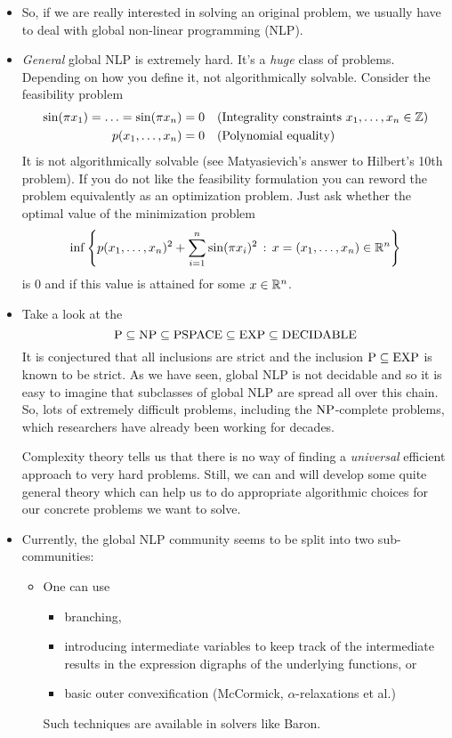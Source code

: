 \begin{itemize}
	\item So, if we are really interested in solving an original problem, we usually have to deal with global non-linear programming (NLP).
	\item \emph{General} global NLP is extremely hard. It's a \emph{huge} class of problems. Depending on how you define it, not algorithmically solvable. Consider the feasibility problem 
	\begin{align*}
		\sin(\pi x_1) = \ldots = \sin(\pi x_n) & = 0 & & \text{(Integrality constraints $x_1,\ldots,x_n \in \mathbb{Z}$)}
		\\ p(x_1,\ldots,x_n) & = 0 & & \text{(Polynomial equality)}
	\end{align*}
	It is not algorithmically solvable (see Matyasievich's answer to Hilbert's 10th problem). If you do not like the feasibility formulation you can reword the problem equivalently as an optimization problem. Just ask whether the optimal value of the minimization problem
	\[
		\inf \left\{ p(x_1,\ldots,x_n)^2 + \sum_{i=1}^n \sin(\pi x_i)^2 \,:\, x=(x_1,\ldots,x_n) \in \mathbb{R}^n \right\} 
	\]
	is $0$ and if this value is attained for some $x \in \mathbb{R}^n$.
	
	\item Take a look at the 
	\[
		\operatorname{P} \subseteq \operatorname{NP} \subseteq \operatorname{PSPACE} \subseteq \operatorname{EXP} \subseteq \operatorname{DECIDABLE}
	\]
	It is conjectured that all inclusions are strict and the inclusion $\operatorname{P} \subseteq \operatorname{EXP}$ is known to be strict. As we have seen, global NLP is not decidable and so it is easy to imagine that subclasses of global NLP are spread all over this chain. So,  lots of extremely difficult problems, including the $\operatorname{NP}$-complete problems, which researchers have already been working  for decades. 
	
	Complexity theory tells us that there is no way of finding a \emph{universal} efficient approach to very hard problems. Still, we can and will develop some quite general theory which can help us to do appropriate algorithmic choices for our concrete problems we want to solve. 
	\item Currently, the global NLP community seems to be split into two sub-communi\-ties:
    \begin{itemize}
	 \item One can use
  	 \begin{itemize}
		\item branching,
		\item introducing intermediate variables to keep track of the intermediate results in the expression digraphs of the underlying functions, or
		\item basic outer convexification (McCormick, $\alpha$-relaxations  et al.)
	\end{itemize}
	Such techniques are available in solvers like Baron. 


\end{itemize}
\end{itemize}
